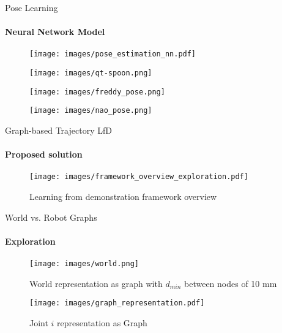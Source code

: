 \documentclass[aspectratio=169]{beamer}
\begin{document}
\begin{frame}{Pose Learning}
	\framesubtitle{Neural Network Model}
	\begin{minipage}{0.5\linewidth}
		\begin{figure}[h]
			\centering
			\texttt{[image: images/pose\_estimation\_nn.pdf]}
			\label{fig:nao_initial}
		\end{figure}
	\end{minipage}\hfill	
	\begin{minipage}{0.5\linewidth}	
		\vspace{-2.5em}
		\begin{figure}[h]
			\centering
			\texttt{[image: images/qt-spoon.png]}
			\label{fig:simulation_teapot}
		\end{figure}
		\vspace{-0.5cm}
		\begin{figure}[h]
			\centering
			\texttt{[image: images/freddy\_pose.png]}
			\label{fig:freddy_pose}
		\end{figure}
		\vspace{-0.5cm}
		\begin{figure}[h]
			\centering
			\texttt{[image: images/nao\_pose.png]}
			\label{fig:nao_initial}
		\end{figure}
	\end{minipage}
\end{frame}

\begin{frame}{Graph-based Trajectory LfD}
	\framesubtitle{Proposed solution}
	\begin{figure}[tp]
		\centering
		\texttt{[image: images/framework\_overview\_exploration.pdf]}
		\vspace{-0.4cm}
		\caption{Learning from demonstration framework overview}
		\label{fig:framework_overview}
	\end{figure}
\end{frame}

\begin{frame}{World vs. Robot Graphs}
	\framesubtitle{Exploration}
	\begin{minipage}{0.4\linewidth}	
		\begin{figure}[h!]
			\texttt{[image: images/world.png]}
			\caption{World representation as graph with $d_{min}$ between nodes of 10 mm}
			\label{fig:world}
		\end{figure}
	\end{minipage}\hfill	
	\begin{minipage}{0.6\linewidth}
		\begin{figure}[h!]
			\texttt{[image: images/graph\_representation.pdf]}
			\caption{Joint $i$ representation as Graph}
			\label{fig:world_small}
		\end{figure}	
	\end{minipage}
\end{frame}
\end{document}
